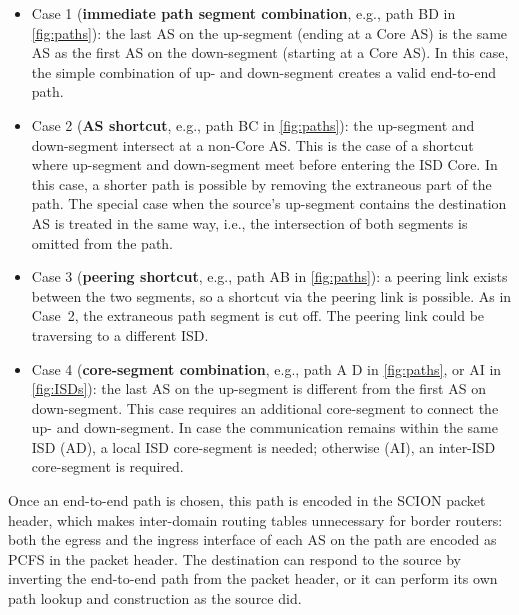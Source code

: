 \documentclass[a4paper]{llncs}
\newcommand\SCION{{\small\textsf{SCION}}\xspace}
\newcommand\A{\textsf{A}\xspace}
\newcommand\B{\textsf{B}\xspace}
\newcommand\C{\textsf{C}\xspace}
\newcommand\D{\textsf{D}\xspace}
\newcommand\I{\textsf{I}\xspace}
\begin{document}
\begin{itemize}

\item Case 1 (\textbf{immediate path segment combination},
e.g., path \B  \D in \autoref{fig:paths}):
the last AS on the up-segment (ending at a Core AS) is the same AS as
the first AS on the down-segment (starting at a Core AS). In this case,
the simple combination of up- and down-segment creates a valid
end-to-end path.


\item Case 2 (\textbf{AS shortcut},
e.g., path \B  \C in \autoref{fig:paths}):
the up-segment and down-segment intersect at a non-Core AS. This is the
case of a shortcut where up-segment and down-segment meet before
entering the ISD Core. In this case, a shorter path is possible by
removing the extraneous part of the path. The special case when the
source's up-segment contains the destination AS is treated in the same
way, i.e., the intersection of both segments is omitted from the path.

\item Case 3 (\textbf{peering shortcut},
e.g., path \A  \B in \autoref{fig:paths}):
a peering link exists between the two segments, so a shortcut via the
peering link is possible. As in Case~2, the extraneous path segment
is cut off. The peering link could be traversing to a different ISD.

\item Case 4 (\textbf{core-segment combination}, e.g., path \A 
\D in \autoref{fig:paths}, or \A  \I in \autoref{fig:ISDs}): the
last AS on the up-segment is different from the first AS on
down-segment. This case requires an additional core-segment to
connect the up- and down-segment. In case the communication remains
within the same ISD (\A  \D), a local ISD core-segment is
needed; otherwise (\A  \I), an inter-ISD core-segment is
required.

\end{itemize}

Once an end-to-end path is chosen, this path is encoded in the \SCION
packet header, which makes inter-domain routing
tables unnecessary for border routers: both the egress and the
ingress interface of each AS on the path are encoded as PCFS in the
packet header. The destination can respond
to the source by inverting the end-to-end path from the packet
header, or it can perform its own path lookup and construction as the
source did.
\end{document}
